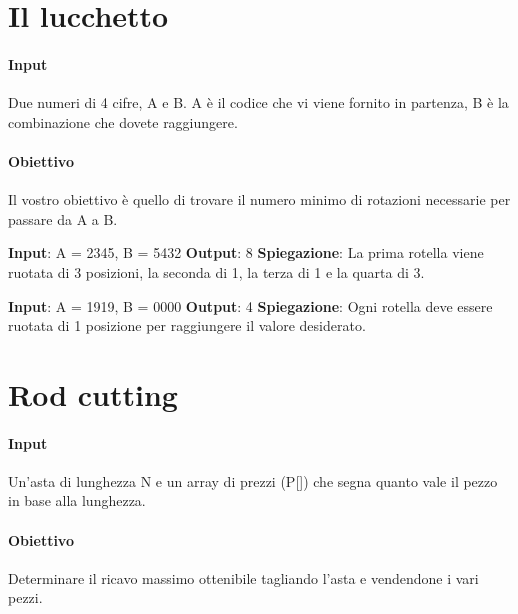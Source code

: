 \setlength{\parskip}{0pt}
\titlespacing*{\subparagraph}{1em}{0em}{0em} 

\thispagestyle{chapterInit}
\section*{Il lucchetto}
    \paragraph{Input} Due numeri di 4 cifre, A e B. A è il codice che vi viene fornito in partenza, B è la combinazione che dovete raggiungere.
    \paragraph{Obiettivo} Il vostro obiettivo è quello di trovare il numero minimo di rotazioni necessarie per passare da A a B.
    \begin{esempio}
        \newline
        \textbf{Input}: A = 2345, B = 5432
        \newline
        \textbf{Output}: 8
        \newline
        \textbf{Spiegazione}: La prima rotella viene ruotata di 3 posizioni, la seconda di 1, la terza di 1 e la quarta di 3.
    \end{esempio}
    \begin{esempio}
        \newline
        \textbf{Input}: A = 1919, B = 0000
        \newline
        \textbf{Output}: 4
        \newline
        \textbf{Spiegazione}: Ogni rotella deve essere ruotata di 1 posizione per raggiungere il valore desiderato.
    \end{esempio}

\newpage
\thispagestyle{chapterInit}
\section*{Rod cutting}
    \paragraph{Input} Un'asta di lunghezza N e un array di prezzi (P[]) che segna quanto vale il pezzo in base alla lunghezza.
    \paragraph{Obiettivo} Determinare il ricavo massimo ottenibile tagliando l'asta e vendendone i vari pezzi.

